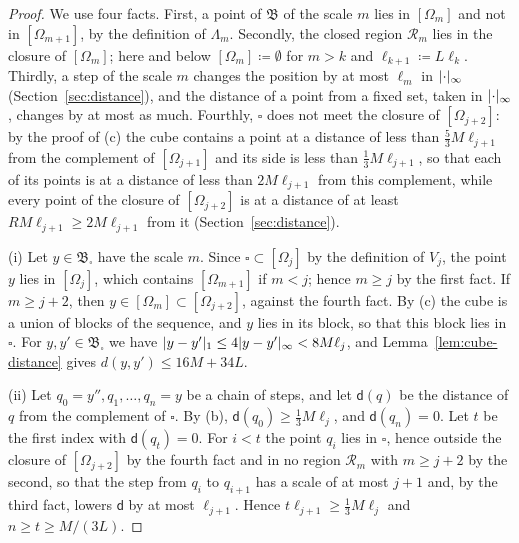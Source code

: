 \documentclass[11pt]{preprint}
\DeclarePairedDelimiter{\abs}{\lvert}{\rvert}
\numberwithin{equation}{section}
\theoremstyle{definition}
\theoremstyle{remark}
\theoremstyle{plain}
\begin{document}
\begin{proof}
We use four facts. First, a point of $\mathfrak B$ of the scale $m$ lies in $[\Omega_m]$ and not in $[\Omega_{m+1}]$, by the definition of $\Lambda_m$. Secondly, the closed region $\mathcal R_m$ lies in the closure of $[\Omega_m]$; here and below $[\Omega_m] \coloneqq \emptyset$ for $m > k$ and $\ell_{k+1} \coloneqq L\ell_k$. Thirdly, a step of the scale $m$ changes the position by at most $\ell_m$ in $\abs\cdot_\infty$ (Section~\ref{sec:distance}), and the distance of a point from a fixed set, taken in $\abs\cdot_\infty$, changes by at most as much. Fourthly, $\square$ does not meet the closure of $[\Omega_{j+2}]$: by the proof of (c) the cube contains a point at a distance of less than $\frac53M\ell_{j+1}$ from the complement of $[\Omega_{j+1}]$ and its side is less than $\frac13M\ell_{j+1}$, so that each of its points is at a distance of less than $2M\ell_{j+1}$ from this complement, while every point of the closure of $[\Omega_{j+2}]$ is at a distance of at least $RM\ell_{j+1} \geq 2M\ell_{j+1}$ from it (Section~\ref{sec:distance}).

(i) Let $y \in \mathfrak B_\square$ have the scale $m$. Since $\square \subset [\Omega_j]$ by the definition of $V_j$, the point $y$ lies in $[\Omega_j]$, which contains $[\Omega_{m+1}]$ if $m < j$; hence $m \geq j$ by the first fact. If $m \geq j + 2$, then $y \in [\Omega_m] \subset [\Omega_{j+2}]$, against the fourth fact. By (c) the cube is a union of blocks of the sequence, and $y$ lies in its block, so that this block lies in $\square$. For $y, y' \in \mathfrak B_\square$ we have $\abs{y - y'}_1 \leq 4\abs{y - y'}_\infty < 8M\ell_j$, and Lemma~\ref{lem:cube-distance} gives $d(y, y') \leq 16M + 34L$.

(ii) Let $q_0 = y'', q_1, \dots, q_n = y$ be a chain of steps, and let $\mathsf d(q)$ be the distance of $q$ from the complement of $\square$. By (b), $\mathsf d(q_0) \geq \frac13M\ell_j$, and $\mathsf d(q_n) = 0$. Let $t$ be the first index with $\mathsf d(q_t) = 0$. For $i < t$ the point $q_i$ lies in $\square$, hence outside the closure of $[\Omega_{j+2}]$ by the fourth fact and in no region $\mathcal R_m$ with $m \geq j + 2$ by the second, so that the step from $q_i$ to $q_{i+1}$ has a scale of at most $j + 1$ and, by the third fact, lowers $\mathsf d$ by at most $\ell_{j+1}$. Hence $t\ell_{j+1} \geq \frac13M\ell_j$ and $n \geq t \geq M/(3L)$.


\end{proof}
\end{document}
